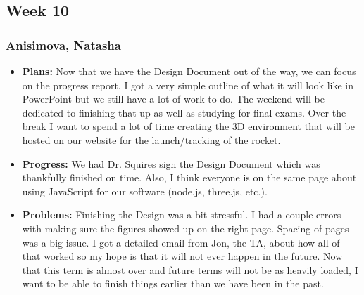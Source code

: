 \documentclass[10pt,draftclsnofoot,onecolumn]{IEEEtran}
\begin{document}
\subsection{Week 10}
\subsubsection{Anisimova, Natasha}
\begin{itemize}
	\item \textbf{Plans: }
	Now that we have the Design Document out of the way, we can focus on the progress report. I got a very simple outline of what it will look like in PowerPoint but we still have a lot of work to do. The weekend will be dedicated to finishing that up as well as studying for final exams. Over the break I want to spend a lot of time creating the 3D environment that will be hosted on our website for the launch/tracking of the rocket.
	\item \textbf{Progress: }
	We had Dr. Squires sign the Design Document which was thankfully finished on time. Also, I think everyone is on the same page about using JavaScript for our software (node.js, three.js, etc.).
	\item \textbf{Problems: }
	Finishing the Design was a bit stressful. I had a couple errors with making sure the figures showed up on the right page. Spacing of pages was a big issue. I got a detailed email from Jon, the TA, about how all of that worked so my hope is that it will not ever happen in the future. Now that this term is almost over and future terms will not be as heavily loaded, I want to be able to finish things earlier than we have been in the past.
\end{itemize}
\end{document}
